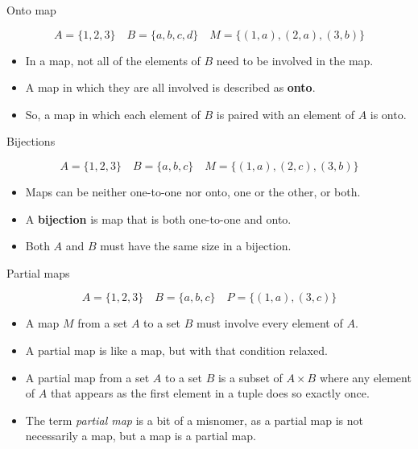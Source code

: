 \begin{frame}{Onto map}
  \begin{topdisp}
    $$ A = \{1,2,3\} \quad  B = \{a,b,c,d\} \quad  M = \{ (1,a), (2,a), (3,b) \} $$
  \end{topdisp}
  \begin{itemize}
    \setlength\itemsep{3mm}
    \item In a map, not all of the elements of $B$ need to be involved in the map.
    \item A map in which they are all involved is described as \textbf{onto}.
    \item So, a map in which each element of $B$ is paired with an element of $A$ is onto.
  \end{itemize}
\end{frame}

\begin{frame}{Bijections}
  \begin{topdisp}
    $$ A = \{1,2,3\} \quad  B = \{a,b,c\} \quad  M = \{ (1,a), (2,c), (3,b) \} $$
  \end{topdisp}
  \begin{itemize}
    \setlength\itemsep{3mm}
    \item Maps can be neither one-to-one nor onto, one or the other, or both.
    \item A \textbf{bijection} is map that is both one-to-one and onto.
    \item Both $A$ and $B$ must have the same size in a bijection.
  \end{itemize}
\end{frame}


\begin{frame}{Partial maps}
  \begin{topdisp}
    $$ A = \{1,2,3\} \quad  B = \{a,b,c\} \quad  P = \{ (1,a), (3,c) \} $$
  \end{topdisp}
  \begin{itemize}
    \setlength\itemsep{3mm}
    \item A map $M$ from a set $A$ to a set $B$ must involve every element of $A$.
    \item A partial map is like a map, but with that condition relaxed.
    \item A partial map from a set $A$ to a set $B$ is a subset of $A \times B$ where any element of $A$ that appears as the first element in a tuple does so exactly once.
    \item The term \emph{partial map} is a bit of a misnomer, as a partial map is not necessarily a map, but a map is a partial map.
  \end{itemize}
\end{frame}